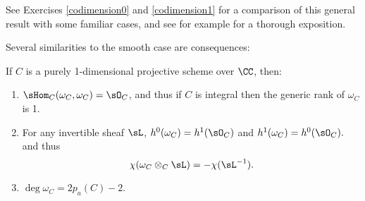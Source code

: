 See Exercises \ref{codimension0} and \ref{codimension1} for a comparison of this general result with some
familiar cases, and see for example \cite{AltmanKleiman} for a thorough exposition.

Several similarities to the smooth case are consequences:

\begin{proposition}\label{similarities}
If $C$ is a purely 1-dimensional projective scheme over $\CC$, then:
\begin{enumerate}

\item $\sHom_C(\omega_C, \omega_C) = \sO_C$, and  thus if $C$ is integral then the generic rank of $\omega_C$ is 1.

\item For any invertible sheaf $\sL$, 
$h^0(\omega_C) = h^1(\sO_C)$ and
$h^1(\omega_C)= h^0(\sO_C).$
and thus
$$
\chi(\omega_C\otimes_C\sL)= -\chi(\sL^{-1}).
$$

\item $\deg \omega_C = 2p_a(C) -2.$

\end{enumerate}
\end{proposition}

